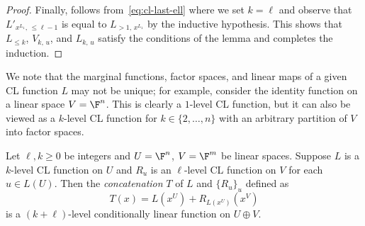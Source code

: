 \begin{proof}
  Finally,  follows from~\eqref{eq:cl-last-ell} where we
  set $k = \ell$ and observe that $L'_{x^{L_1},\, \le \ell-1}$ is equal to
  $L_{>1,\, x^{L_1}}$ by the inductive hypothesis.
  This shows that $L_{\le k}$, $V_{k,\, u}$, and $L_{k,\, u}$ satisfy the
  conditions of the lemma and completes the induction.
\end{proof}

We note that the marginal functions, factor spaces, and linear maps of a given
CL function $L$ may not be unique; for example, consider the identity function
on a linear space $V = \F^n$.
This is clearly a $1$-level CL function, but it can also be viewed as a
$k$-level CL function for $k \in \{2, \ldots, n\}$ with an arbitrary partition
of $V$ into factor spaces.

\begin{lemma}
  \label{lem:cl-concat}
  Let $\ell, k \ge 0$ be integers and $U = \F^n$, $V = \F^m$ be linear spaces.
  Suppose $L$ is a $k$-level CL function on $U$ and $R_u$ is an $\ell$-level CL
  function on $V$ for each $u \in L(U)$.
  Then the \emph{concatenation} $T$ of $L$ and $\{R_u\}_u$ defined as
  \begin{equation*}
    T (x) = L(x^U) + R_{L(x^U)} (x^V)
  \end{equation*}
  is a $(k+\ell)$-level conditionally linear function on $U\oplus V$.
\end{lemma}

